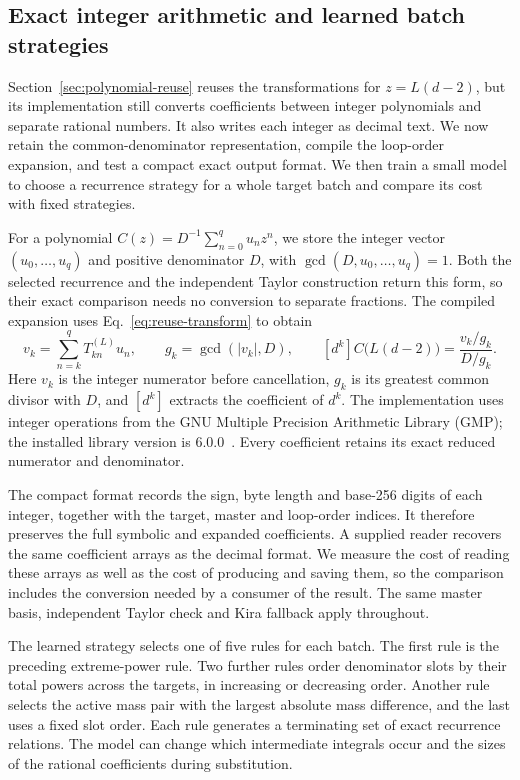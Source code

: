 \clearpage
\subsection{Exact integer arithmetic and learned batch strategies}
\label{sec:exact-backend}
Section~\ref{sec:polynomial-reuse} reuses the transformations for
\(z=L(d-2)\), but its implementation still converts coefficients between
integer polynomials and separate rational numbers. It also writes each
integer as decimal text. We now retain the common-denominator representation,
compile the loop-order expansion, and test a compact exact output format.
We then train a small model to choose a recurrence strategy for a whole
target batch and compare its cost with fixed strategies.

For a polynomial \(C(z)=D^{-1}\sum_{n=0}^{q}u_nz^n\), we store the integer
vector \((u_0,\ldots,u_q)\) and positive denominator \(D\), with
\(\gcd(D,u_0,\ldots,u_q)=1\). Both the selected recurrence and the independent
Taylor construction return this form, so their exact comparison needs
no conversion to separate fractions. The compiled expansion uses
Eq.~\eqref{eq:reuse-transform} to obtain
\begin{equation}
 v_k=\sum_{n=k}^{q}T^{(L)}_{kn}u_n,\qquad
 g_k=\gcd(|v_k|,D),\qquad
 [d^k]C\bigl(L(d-2)\bigr)=\frac{v_k/g_k}{D/g_k}.
 \label{eq:backend-integer}
\end{equation}
Here \(v_k\) is the integer numerator before cancellation, \(g_k\) is its
greatest common divisor with \(D\), and \([d^k]\) extracts the coefficient
of \(d^k\). The implementation uses integer operations from the GNU Multiple Precision
Arithmetic Library (GMP); the installed
library version is 6.0.0~\cite{GMPIntegerManual}. Every coefficient
retains its exact reduced numerator and denominator.

The compact format records the sign, byte length and base-256 digits of
each integer, together with the target, master and loop-order indices.
It therefore preserves the full symbolic and expanded coefficients.
A supplied reader recovers the same coefficient arrays as the decimal
format. We measure the cost of reading these arrays as well as the
cost of producing and saving them, so the comparison includes the
conversion needed by a consumer of the result. The same master basis,
independent Taylor check and Kira fallback apply throughout.

The learned strategy selects one of five rules for each batch.
The first rule is the preceding extreme-power rule. Two further rules
order denominator slots by their total powers across the targets,
in increasing or decreasing order. Another rule selects the active
mass pair with the largest absolute mass difference, and the last
uses a fixed slot order. Each rule generates a terminating set of
exact recurrence relations. The model can change which intermediate
integrals occur and the sizes of the rational coefficients during
substitution.

